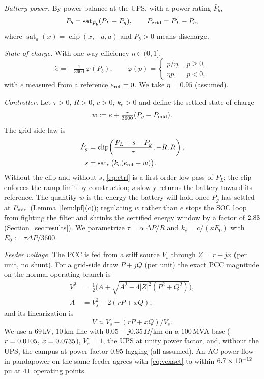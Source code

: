 \documentclass[journal]{IEEEtran}
\theoremstyle{remark}
\newcommand{\clip}{\operatorname{clip}}
\newcommand{\sat}{\operatorname{sat}}
\newcommand{\Pbar}{\bar P_b}
\begin{document}
\emph{Battery power.} By power balance at the UPS, with a power rating $\Pbar$,
\begin{equation}\label{eq:battery}
P_b=\sat_{\Pbar}(P_L-P_g),\qquad P_{\rm grid}=P_L-P_b,
\end{equation}
where $\sat_a(x)=\clip(x,-a,a)$ and $P_b>0$ means discharge.

\emph{State of charge.} With one-way efficiency $\eta\in(0,1]$,
\begin{equation}\label{eq:soc}
\dot e=-\tfrac{1}{3600}\,\varphi(P_b),\qquad
\varphi(p)=\begin{cases}p/\eta,&p\ge 0,\\ \eta p,&p<0,\end{cases}
\end{equation}
with $e$ measured from a reference $e_{\rm ref}=0$. We take $\eta=0.95$ (assumed).

\emph{Controller.} Let $\tau>0$, $R>0$, $c>0$, $k_e>0$ and define the settled state of charge
\begin{equation}\label{eq:w}
w:=e+\tfrac{\tau}{3600}(P_g-P_{\rm mid}).
\end{equation}
The grid-side law is
\begin{equation}\label{eq:ctrl}
\begin{aligned}
\dot P_g&=\clip\!\left(\frac{P_L+s-P_g}{\tau},-R,R\right),\\
s&=\sat_c\big(k_e(e_{\rm ref}-w)\big).
\end{aligned}
\end{equation}
Without the clip and without $s$, \eqref{eq:ctrl} is a first-order low-pass of $P_L$; the clip enforces the ramp limit
by construction; $s$ slowly returns the battery toward its reference. The quantity $w$ is the energy the battery will
hold once $P_g$ has settled at $P_{\rm mid}$ (Lemma~\ref{lem:lpf}(c)); regulating $w$ rather than $e$ stops the SOC
loop from fighting the filter and shrinks the certified energy window by a factor of $2.83$
(Section~\ref{sec:results}).
We parametrize $\tau=\alpha\,\Delta P/R$ and $k_e=c/(\kappa E_0)$ with $E_0:=\tau\Delta P/3600$.

\emph{Feeder voltage.} The PCC is fed from a stiff source $V_s$ through $Z=r+jx$ (per unit, no shunt). For a
grid-side draw $P+jQ$ (per unit) the exact PCC magnitude on the normal operating branch is
\begin{equation}\label{eq:vexact}
\begin{aligned}
V^2&=\tfrac12\Big(A+\sqrt{A^2-4|Z|^2(P^2+Q^2)}\Big),\\
A&=V_s^2-2(rP+xQ),
\end{aligned}
\end{equation}
and its linearization is
\begin{equation}\label{eq:vlin}
V\approx V_s-(rP+xQ)/V_s.
\end{equation}
We use a $69$\,kV, $10$\,km line with $0.05+j0.35\,\Omega$/km on a $100$\,MVA base ($r=0.0105$, $x=0.0735$), $V_s=1$,
the UPS at unity power factor, and, without the UPS, the campus at power factor $0.95$ lagging (all assumed).
An AC power flow in pandapower \cite{thurner2018} on the same feeder agrees with \eqref{eq:vexact} to within
$6.7\times10^{-12}$\,pu at $41$ operating points.
\end{document}

